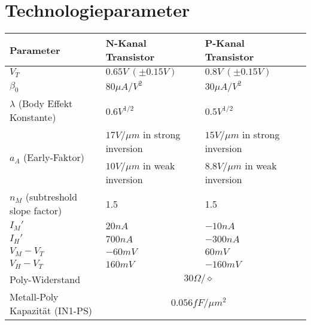 \appendix

\section{Technologieparameter}

\begin{tabularx}{\linewidth}{|X|l|ll|}
	\hline
		\textbf{Parameter} & \textbf{N-Kanal Transistor} & \textbf{P-Kanal Transistor} &
	\\ \hline
		$V_T$ & $0.65V \: (\pm 0.15V)$ & $0.8V \: (\pm 0.15V)$ &
	\\ \hline
		$\beta_0$ & $80 \mu A / V^2$ & $30 \mu A / V^2$ &
	\\ \hline
		$\lambda$ (Body Effekt Konstante) & $0.6V^{1/2}$ & $0.5 V^{1/2}$ & 
	\\ \hline
		\multirow{2}{*}{$a_A$ (Early-Faktor)} & $17V/\mu m$ in strong inversion & $15V/\mu m$ in strong inversion &
	\\
		& $10V/\mu m$ in weak inversion & $8.8V/\mu m$ in weak inversion &
	\\ \hline
		$n_M$ (subtreshold slope factor) & 1.5 & 1.5 &
	\\ \hline
		$I_M'$ & $20nA$ & $-10nA$ &
	\\ \hline
		$I_H'$ & $700nA$ & $-300nA$ &
	\\ \hline
		$V_M-V_T$ & $-60mV$ & $60mV$ &
	\\ \hline
		$V_H-V_T$ & $160mV$ & $-160mV$ &
	\\ \hline
		Poly-Widerstand & \multicolumn{2}{c}{$30 \Omega / \diamond$} &
	\\ \hline
		Metall-Poly Kapazität (IN1-PS) & \multicolumn{2}{c}{$0.056 fF / \mu m^2$} &
	\\ \hline
\end{tabularx}